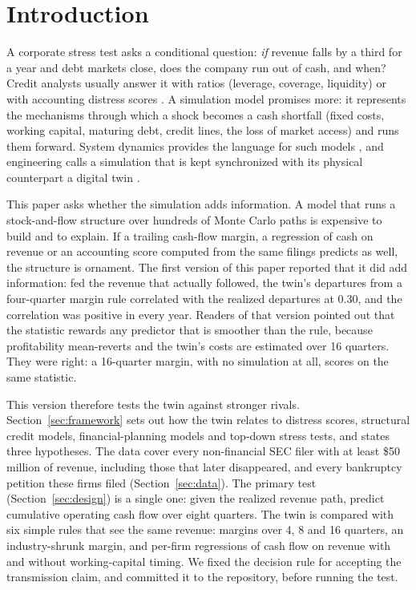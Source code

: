 \documentclass[11pt]{article}
\begin{document}
\section{Introduction}\label{sec:intro}

A corporate stress test asks a conditional question: \emph{if} revenue falls by a third for a year and debt markets close, does the company run out of cash, and when? Credit analysts usually answer it with ratios (leverage, coverage, liquidity) or with accounting distress scores \citep{beaver1966,altman1968,ohlson1980,zmijewski1984}. A simulation model promises more: it represents the mechanisms through which a shock becomes a cash shortfall (fixed costs, working capital, maturing debt, credit lines, the loss of market access) and runs them forward. System dynamics provides the language for such models \citep{forrester1961,sterman2000}, and engineering calls a simulation that is kept synchronized with its physical counterpart a digital twin \citep{grieves2017,tao2019,kritzinger2018}.

This paper asks whether the simulation adds information. A model that runs a stock-and-flow structure over hundreds of Monte Carlo paths is expensive to build and to explain. If a trailing cash-flow margin, a regression of cash on revenue or an accounting score computed from the same filings predicts as well, the structure is ornament. The first version of this paper reported that it did add information: fed the revenue that actually followed, the twin's departures from a four-quarter margin rule correlated with the realized departures at 0.30, and the correlation was positive in every year. Readers of that version pointed out that the statistic rewards any predictor that is smoother than the rule, because profitability mean-reverts \citep{fama2000} and the twin's costs are estimated over 16 quarters. They were right: a 16-quarter margin, with no simulation at all, scores \TrIncrSixteen{} on the same statistic.

This version therefore tests the twin against stronger rivals. Section~\ref{sec:framework} sets out how the twin relates to distress scores, structural credit models, financial-planning models and top-down stress tests, and states three hypotheses. The data cover every non-financial SEC filer with at least \$50 million of revenue, including those that later disappeared, and every bankruptcy petition these firms filed (Section~\ref{sec:data}). The primary test (Section~\ref{sec:design}) is a single one: given the realized revenue path, predict cumulative operating cash flow over eight quarters. The twin is compared with six simple rules that see the same revenue: margins over 4, 8 and 16 quarters, an industry-shrunk margin, and per-firm regressions of cash flow on revenue with and without working-capital timing. We fixed the decision rule for accepting the transmission claim, and committed it to the repository, before running the test.
\end{document}
